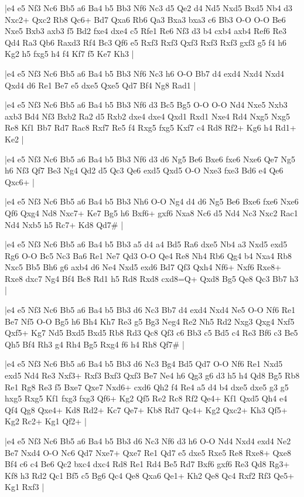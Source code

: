 \whitename{}
\blackname{}
\makegametitle
|e4 e5 Nf3 Nc6 Bb5 a6 Ba4 b5 Bb3 Nf6 Nc3 d5 Qe2 d4 Nd5 Nxd5 Bxd5 Nb4 d3 Nxc2+ Qxc2 Rb8 Qc6+ Bd7 Qxa6 Rb6 Qa3 Bxa3 bxa3 c6 Bb3 O-O O-O Be6 Nxe5 Bxb3 axb3 f5 Bd2 fxe4 dxe4 c5 Rfe1 Re6 Nf3 d3 b4 cxb4 axb4 Ref6 Re3 Qd4 Ra3 Qb6 Raxd3 Rf4 Bc3 Qf6 e5 Rxf3 Rxf3 Qxf3 Rxf3 Rxf3 gxf3 g5 f4 h6 Kg2 h5 fxg5 h4 f4 Kf7 f5 Ke7 Kh3  |

\whitename{}
\blackname{}
\makegametitle
|e4 e5 Nf3 Nc6 Bb5 a6 Ba4 b5 Bb3 Nf6 Nc3 h6 O-O Bb7 d4 exd4 Nxd4 Nxd4 Qxd4 d6 Re1 Be7 e5 dxe5 Qxe5 Qd7 Bf4 Ng8 Rad1  |

\whitename{}
\blackname{}
\makegametitle
|e4 e5 Nf3 Nc6 Bb5 a6 Ba4 b5 Bb3 Nf6 d3 Bc5 Bg5 O-O O-O Nd4 Nxe5 Nxb3 axb3 Bd4 Nf3 Bxb2 Ra2 d5 Rxb2 dxe4 dxe4 Qxd1 Rxd1 Nxe4 Rd4 Nxg5 Nxg5 Re8 Kf1 Bb7 Rd7 Rac8 Rxf7 Re5 f4 Rxg5 fxg5 Kxf7 c4 Rd8 Rf2+ Kg6 h4 Rd1+ Ke2  |

\whitename{}
\blackname{}
\makegametitle
|e4 e5 Nf3 Nc6 Bb5 a6 Ba4 b5 Bb3 Nf6 d3 d6 Ng5 Be6 Bxe6 fxe6 Nxe6 Qe7 Ng5 h6 Nf3 Qf7 Be3 Ng4 Qd2 d5 Qc3 Qe6 exd5 Qxd5 O-O Nxe3 fxe3 Bd6 e4 Qe6 Qxc6+  |

\whitename{}
\blackname{}
\makegametitle
|e4 e5 Nf3 Nc6 Bb5 a6 Ba4 b5 Bb3 Nh6 O-O Ng4 d4 d6 Ng5 Be6 Bxe6 fxe6 Nxe6 Qf6 Qxg4 Nd8 Nxc7+ Ke7 Bg5 h6 Bxf6+ gxf6 Nxa8 Nc6 d5 Nd4 Nc3 Nxc2 Rac1 Nd4 Nxb5 h5 Rc7+ Kd8 Qd7\#  |

\whitename{}
\blackname{}
\makegametitle
|e4 e5 Nf3 Nc6 Bb5 a6 Ba4 b5 Bb3 a5 d4 a4 Bd5 Ra6 dxe5 Nb4 a3 Nxd5 exd5 Rg6 O-O Bc5 Nc3 Ba6 Re1 Ne7 Qd3 O-O Qe4 Re8 Nh4 Rb6 Qg4 b4 Nxa4 Rb8 Nxc5 Bb5 Bh6 g6 axb4 d6 Ne4 Nxd5 exd6 Bd7 Qf3 Qxh4 Nf6+ Nxf6 Rxe8+ Rxe8 dxc7 Ng4 Bf4 Bc8 Rd1 h5 Rd8 Rxd8 cxd8=Q+ Qxd8 Bg5 Qe8 Qc3 Bb7 h3  |

\whitename{}
\blackname{}
\makegametitle
|e4 e5 Nf3 Nc6 Bb5 a6 Ba4 b5 Bb3 d6 Nc3 Bb7 d4 exd4 Nxd4 Ne5 O-O Nf6 Re1 Be7 Nf5 O-O Bg5 h6 Bh4 Kh7 Re3 g5 Bg3 Neg4 Re2 Nh5 Rd2 Nxg3 Qxg4 Nxf5 Qxf5+ Kg7 Nd5 Bxd5 Bxd5 Rb8 Rd3 Qc8 Qf3 c6 Bb3 c5 Bd5 c4 Re3 Bf6 c3 Be5 Qh5 Bf4 Rh3 g4 Rh4 Bg5 Rxg4 f6 h4 Rh8 Qf7\#  |

\whitename{}
\blackname{}
\makegametitle
|e4 e5 Nf3 Nc6 Bb5 a6 Ba4 b5 Bb3 d6 Nc3 Bg4 Bd5 Qd7 O-O Nf6 Re1 Nxd5 exd5 Nd4 Re3 Nxf3+ Rxf3 Bxf3 Qxf3 Be7 Ne4 h6 Qg3 g6 d3 h5 h4 Qd8 Bg5 Rb8 Re1 Rg8 Re3 f5 Bxe7 Qxe7 Nxd6+ cxd6 Qh2 f4 Re4 a5 d4 b4 dxe5 dxe5 g3 g5 hxg5 Rxg5 Kf1 fxg3 fxg3 Qf6+ Kg2 Qf5 Re2 Rc8 Rf2 Qe4+ Kf1 Qxd5 Qh4 e4 Qf4 Qg8 Qxe4+ Kd8 Rd2+ Kc7 Qe7+ Kb8 Rd7 Qc4+ Kg2 Qxc2+ Kh3 Qf5+ Kg2 Rc2+ Kg1 Qf2+  |

\whitename{}
\blackname{}
\makegametitle
|e4 e5 Nf3 Nc6 Bb5 a6 Ba4 b5 Bb3 d6 Nc3 Nf6 d3 h6 O-O Nd4 Nxd4 exd4 Ne2 Be7 Nxd4 O-O Nc6 Qd7 Nxe7+ Qxe7 Re1 Qd7 e5 dxe5 Rxe5 Re8 Rxe8+ Qxe8 Bf4 c6 c4 Be6 Qc2 bxc4 dxc4 Rd8 Re1 Rd4 Be5 Rd7 Bxf6 gxf6 Re3 Qd8 Rg3+ Kf8 h3 Rd2 Qc1 Bf5 c5 Bg6 Qc4 Qe8 Qxa6 Qe1+ Kh2 Qe8 Qc4 Rxf2 Rf3 Qe5+ Kg1 Rxf3  |

